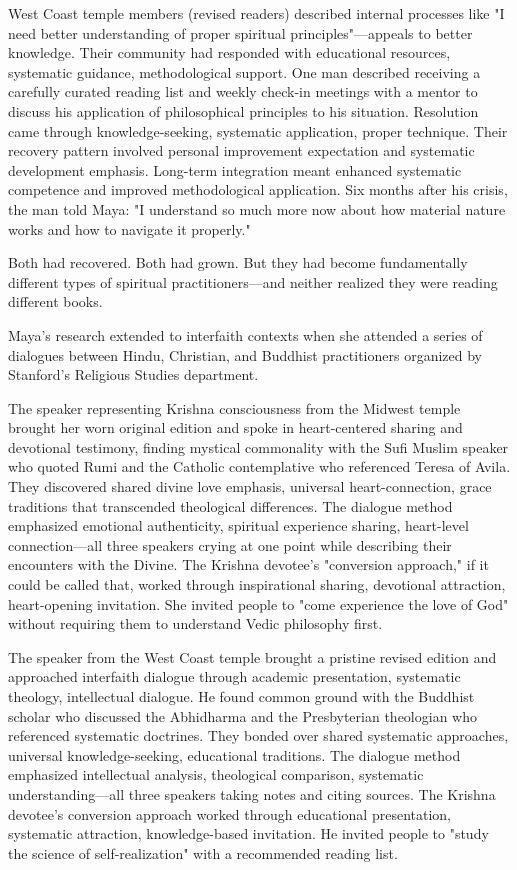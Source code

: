 \documentclass[12pt,twoside]{book}
\begin{document}
West Coast temple members (revised readers) described internal processes like "I need better understanding of proper spiritual principles"—appeals to better knowledge. Their community had responded with educational resources, systematic guidance, methodological support. One man described receiving a carefully curated reading list and weekly check-in meetings with a mentor to discuss his application of philosophical principles to his situation. Resolution came through knowledge-seeking, systematic application, proper technique. Their recovery pattern involved personal improvement expectation and systematic development emphasis. Long-term integration meant enhanced systematic competence and improved methodological application. Six months after his crisis, the man told Maya: "I understand so much more now about how material nature works and how to navigate it properly."

Both had recovered. Both had grown. But they had become fundamentally different types of spiritual practitioners—and neither realized they were reading different books.

Maya's research extended to interfaith contexts when she attended a series of dialogues between Hindu, Christian, and Buddhist practitioners organized by Stanford's Religious Studies department.

The speaker representing Krishna consciousness from the Midwest temple brought her worn original edition and spoke in heart-centered sharing and devotional testimony, finding mystical commonality with the Sufi Muslim speaker who quoted Rumi and the Catholic contemplative who referenced Teresa of Avila. They discovered shared divine love emphasis, universal heart-connection, grace traditions that transcended theological differences. The dialogue method emphasized emotional authenticity, spiritual experience sharing, heart-level connection—all three speakers crying at one point while describing their encounters with the Divine. The Krishna devotee's "conversion approach," if it could be called that, worked through inspirational sharing, devotional attraction, heart-opening invitation. She invited people to "come experience the love of God" without requiring them to understand Vedic philosophy first.

The speaker from the West Coast temple brought a pristine revised edition and approached interfaith dialogue through academic presentation, systematic theology, intellectual dialogue. He found common ground with the Buddhist scholar who discussed the Abhidharma and the Presbyterian theologian who referenced systematic doctrines. They bonded over shared systematic approaches, universal knowledge-seeking, educational traditions. The dialogue method emphasized intellectual analysis, theological comparison, systematic understanding—all three speakers taking notes and citing sources. The Krishna devotee's conversion approach worked through educational presentation, systematic attraction, knowledge-based invitation. He invited people to "study the science of self-realization" with a recommended reading list.
\end{document}
